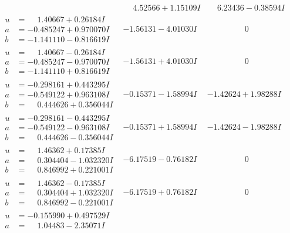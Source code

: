 \documentclass[1p]{elsarticle_modified}
\theoremstyle{definition}
\begin{document}
$$\begin{array}{c|c|c}
 & \phantom{-}4.52566 + 1.15109 I & \phantom{-}6.23436 - 0.38594 I \\ \hline\begin{aligned}
u &= \phantom{-}1.40667 + 0.26184 I \\
a &= -0.485247 + 0.970070 I \\
b &= -1.141110 - 0.816619 I\end{aligned}
 & -1.56131 - 4.01030 I & \phantom{-0.000000 } 0 \\ \hline\begin{aligned}
u &= \phantom{-}1.40667 - 0.26184 I \\
a &= -0.485247 - 0.970070 I \\
b &= -1.141110 + 0.816619 I\end{aligned}
 & -1.56131 + 4.01030 I & \phantom{-0.000000 } 0 \\ \hline\begin{aligned}
u &= -0.298161 + 0.443295 I \\
a &= -0.549122 + 0.963108 I \\
b &= \phantom{-}0.444626 + 0.356044 I\end{aligned}
 & -0.15371 - 1.58994 I & -1.42624 + 1.98288 I \\ \hline\begin{aligned}
u &= -0.298161 - 0.443295 I \\
a &= -0.549122 - 0.963108 I \\
b &= \phantom{-}0.444626 - 0.356044 I\end{aligned}
 & -0.15371 + 1.58994 I & -1.42624 - 1.98288 I \\ \hline\begin{aligned}
u &= \phantom{-}1.46362 + 0.17385 I \\
a &= \phantom{-}0.304404 - 1.032320 I \\
b &= \phantom{-}0.846992 + 0.221001 I\end{aligned}
 & -6.17519 - 0.76182 I & \phantom{-0.000000 } 0 \\ \hline\begin{aligned}
u &= \phantom{-}1.46362 - 0.17385 I \\
a &= \phantom{-}0.304404 + 1.032320 I \\
b &= \phantom{-}0.846992 - 0.221001 I\end{aligned}
 & -6.17519 + 0.76182 I & \phantom{-0.000000 } 0 \\ \hline\begin{aligned}
u &= -0.155990 + 0.497529 I \\
a &= \phantom{-}1.04483 - 2.35071 I \\

\end{aligned}
\end{array}$$
\end{document}

